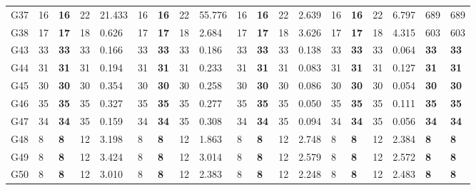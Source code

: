\documentclass[12pt, a4paper]{article}%
\numberwithin{equation}{section}
\theoremstyle{plain}
\begin{document}
{\begin{landscape}
\begin{longtable}{lllllllllllllllllll}
						G37                       & 16   & \textbf{16}  & 22  & 21.433  & 16      & \textbf{16}  & 22    & 55.776  & 16   & \textbf{16}  & 22  & 2.639   & 16     & \textbf{16}  & 22    & 6.797   & 689                     & 689                  \\
						G38                       & 17   & \textbf{17}  & 18  & 0.626   & 17      & \textbf{17}  & 18    & 2.684   & 17   & \textbf{17}  & 18  & 3.626   & 17     & \textbf{17}  & 18    & 4.315   & 603                     & 603                  \\
						G43                       & 33   & \textbf{33}  & 33  & 0.166   & 33      & \textbf{33}  & 33    & 0.186   & 33   & \textbf{33}  & 33  & 0.138   & 33     & \textbf{33}  & 33    & 0.064   & \textbf{33}             & \textbf{33}          \\
						G44                       & 31   & \textbf{31}  & 31  & 0.194   & 31      & \textbf{31}  & 31    & 0.233   & 31   & \textbf{31}  & 31  & 0.083   & 31     & \textbf{31}  & 31    & 0.127   & \textbf{31}             & \textbf{31}          \\
						G45                       & 30   & \textbf{30}  & 30  & 0.354   & 30      & \textbf{30}  & 30    & 0.258   & 30   & \textbf{30}  & 30  & 0.086   & 30     & \textbf{30}  & 30    & 0.054   & \textbf{30}             & \textbf{30}          \\
						G46                       & 35   & \textbf{35}  & 35  & 0.327   & 35      & \textbf{35}  & 35    & 0.277   & 35   & \textbf{35}  & 35  & 0.050   & 35     & \textbf{35}  & 35    & 0.111   & \textbf{35}             & \textbf{35}          \\
						G47                       & 34   & \textbf{34}  & 35  & 0.159   & 34      & \textbf{34}  & 35    & 0.308   & 34   & \textbf{34}  & 35  & 0.094   & 34     & \textbf{34}  & 35    & 0.056   & \textbf{34}             & \textbf{34}          \\
						G48                       & 8    & \textbf{8}   & 12  & 3.198   & 8       & \textbf{8}   & 12    & 1.863   & 8    & \textbf{8}   & 12  & 2.748   & 8      & \textbf{8}   & 12    & 2.384   & \textbf{8}              & \textbf{8}           \\
						G49                       & 8    & \textbf{8}   & 12  & 3.424   & 8       & \textbf{8}   & 12    & 3.014   & 8    & \textbf{8}   & 12  & 2.579   & 8      & \textbf{8}   & 12    & 2.572   & \textbf{8}              & \textbf{8}           \\
						G50                       & 8    & \textbf{8}   & 12  & 3.010   & 8       & \textbf{8}   & 12    & 2.383   & 8    & \textbf{8}   & 12  & 2.248   & 8      & \textbf{8}   & 12    & 2.483   & \textbf{8}              & \textbf{8}           \\

\end{longtable}
\end{landscape}}
\end{document}
